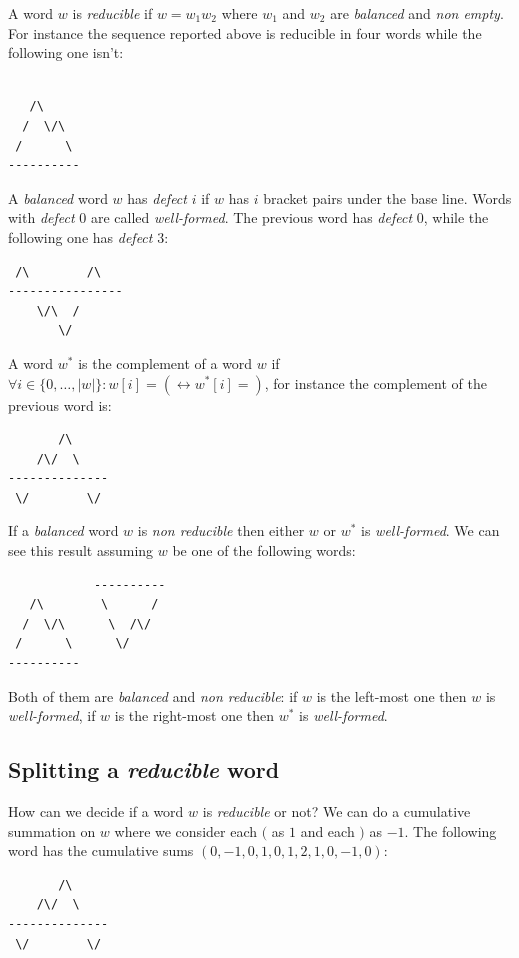 A word $w$ is \emph{reducible} if $w = w_1 w_2$ where $w_1$ and $w_2$
are \emph{balanced} and \emph{non empty}. For instance the sequence
reported above is reducible in four words while the following one
isn't:
\begin{verbatim}

   /\
  /  \/\ 
 /      \
----------
\end{verbatim}

A \emph{balanced} word $w$ has \emph{defect} $i$ if $w$ has $i$
bracket pairs under the base line. Words with \emph{defect} $0$ are
called \emph{well-formed}. The previous word has \emph{defect} $0$,
while the following one has \emph{defect} $3$:
\begin{verbatim}
 /\        /\
----------------
    \/\  /
       \/
\end{verbatim}

A word $w^*$ is the complement of a word $w$ if $\forall i \in
\{0,\ldots,|w|\}: w[i]=( \leftrightarrow w^*[i]=)$, for instance the
complement of the previous word is:
\begin{verbatim}
       /\
    /\/  \   
--------------
 \/        \/ 
\end{verbatim}

If a \emph{balanced} word $w$ is \emph{non reducible} then either $w$
or $w^*$ is \emph{well-formed}. We can see this result assuming $w$ be
one of the following words:
\begin{verbatim}
            ----------
   /\        \      /
  /  \/\      \  /\/
 /      \      \/
----------
\end{verbatim}
Both of them are \emph{balanced} and \emph{non reducible}: if $w$ is
the left-most one then $w$ is \emph{well-formed}, if $w$ is the
right-most one then $w^*$ is \emph{well-formed}.

\subsection{Splitting a \emph{reducible} word}
How can we decide if a word $w$ is \emph{reducible} or not? We can do
a cumulative summation on $w$ where we consider each $($ as $1$ and
each $)$ as $-1$. The following word has the cumulative sums
$(0,-1,0,1,0,1,2,1,0,-1,0)$:
\begin{verbatim}
       /\
    /\/  \   
--------------
 \/        \/ 
\end{verbatim}

